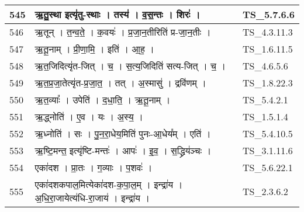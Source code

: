 \documentclass[17pt]{extarticle}
\begin{document}
\begin{longtable}{||p{0.4in}||p{4.9in}||p{0.9in}||}
    \hline
        
    545 & ऋ॒तु॒स्था इत्यृ॑तु{-}स्थाः   ।   तस्य॑   ।   व॒स॒न्तः   ।   शिरः॑   ।    & TS\_5.7.6.6       \\
    
    \hline
        
    546 & ऋ॒तून्   ।   त॒न्व॒ते॒   ।   क॒वयः॑   ।   प्र॒जा॒न॒तीरिति॑ प्र{-}जा॒न॒तीः   ।    & TS\_4.3.11.3       \\
    
    \hline
        
    547 & ऋ॒तू॒नाम्   ।   प्री॒णा॒मि॒   ।   इति॑   ।   आ॒ह॒   ।    & TS\_1.6.11.5       \\
    
    \hline
        
    548 & ऋ॒त॒जिदित्यृ॑त{-}जित्   ।   च॒   ।   स॒त्य॒जिदिति॑ सत्य{-}जित्   ।   च॒   ।    & TS\_4.6.5.6       \\
    
    \hline
        
    549 & ऋ॒त॒प्र॒जा॒तेत्यृ॑त{-}प्र॒जा॒त॒   ।   तत्   ।   अ॒स्मासु॑   ।   द्रवि॑णम्   ।    & TS\_1.8.22.3       \\
    
    \hline
        
    550 & ऋ॒त॒व्याः᳚   ।   उपेति॑   ।   द॒धा॒ति॒   ।   ऋ॒तू॒नाम्   ।    & TS\_5.4.2.1       \\
    
    \hline
        
    551 & ऋ॒द्ध्नोति॑   ।   ए॒व   ।   यः   ।   अ॒स्य॒   ।    & TS\_1.5.1.4       \\
    
    \hline
        
    552 & ऋ॒ध्नोति॑   ।   सः   ।   पु॒न॒रा॒धेय॒मिति॑ पुनः{-}आ॒धेय᳚म्   ।   एति॑   ।    & TS\_5.4.10.5       \\
    
    \hline
        
    553 & ऋ॒ष्टि॒मन्त॒ इत्यृ॑ष्टि{-}मन्तः॑   ।   आपः॑   ।   इ॒व॒   ।   स॒द्ध्रिय॑ञ्चः   ।    & TS\_3.1.11.6       \\
    
    \hline
        
    554 & एका॑दश   ।   प्रा॒तः   ।   ग॒व्याः   ।   प॒शवः॑   ।    & TS\_5.6.22.1       \\
    
    \hline
        
    555 & एका॑दशकपाल॒मित्येका॑दश{-}क॒पा॒ल॒म्   ।   इन्द्रा॑य   ।   अ॒धि॒रा॒जायेत्य॑धि{-}रा॒जाय॑   ।   इन्द्रा॑य   ।    & TS\_2.3.6.2       \\
    

\end{longtable}
\end{document}
